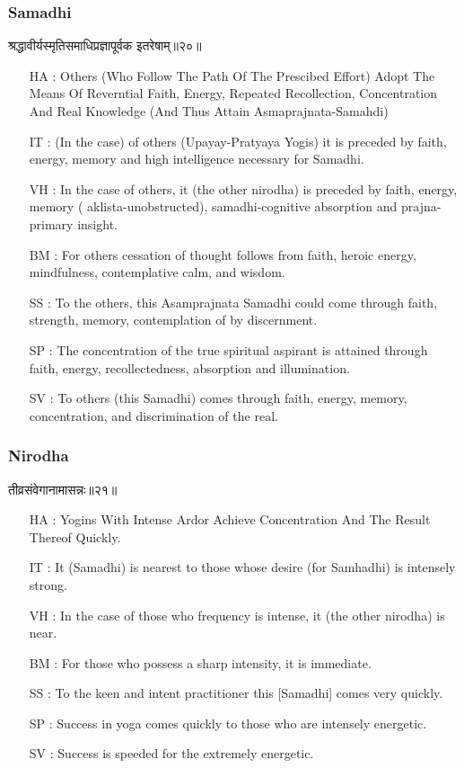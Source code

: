\begin{frame}[fragile]\frametitle{Samadhi}
\begin{sanskrit}
श्रद्धावीर्यस्मृतिसमाधिप्रज्ञापूर्वक इतरेषाम्॥२०॥
\end{sanskrit}

	\begin{itemize}
	\item [HA]: Others (Who Follow The Path Of The Prescibed Effort) Adopt The Means Of Reverntial Faith, Energy, Repeated Recollection, Concentration And Real Knowledge (And Thus Attain Asmaprajnata-Samahdi)
	\item [IT]: (In the case) of others (Upayay-Pratyaya Yogis) it is preceded by faith, energy, memory and high intelligence necessary for Samadhi.
	\item [VH]: In the case of others, it (the other nirodha) is preceded by faith, energy, memory ( aklista-unobstructed), samadhi-cognitive absorption and prajna-primary insight.
	\item [BM]: For others cessation of thought follows from faith, heroic energy, mindfulness, contemplative calm, and wisdom.
	\item [SS]: To the others, this Asamprajnata Samadhi could come through faith, strength, memory, contemplation of by discernment.
	\item [SP]: The concentration of the true spiritual aspirant is attained through faith, energy, recollectedness, absorption and illumination.
	\item [SV]: To others (this Samadhi) comes through faith, energy, memory, concentration, and discrimination of the real. 
	\end{itemize}
\end{frame}

\begin{frame}[fragile]\frametitle{Nirodha}
\begin{sanskrit}
तीव्रसंवेगानामासन्नः॥२१॥
\end{sanskrit}

	\begin{itemize}
	\item [HA]: Yogins With Intense Ardor Achieve Concentration And The Result Thereof Quickly.
	\item [IT]: It (Samadhi) is nearest to those whose desire (for Samhadhi) is intensely strong.
	\item [VH]: In the case of those who frequency is intense, it (the other nirodha) is near.
	\item [BM]: For those who possess a sharp intensity, it is immediate.
	\item [SS]: To the keen and intent practitioner this [Samadhi] comes very quickly.
	\item [SP]: Success in yoga comes quickly to those who are intensely energetic.
	\item [SV]: Success is speeded for the extremely energetic.
	\end{itemize}
\end{frame}



